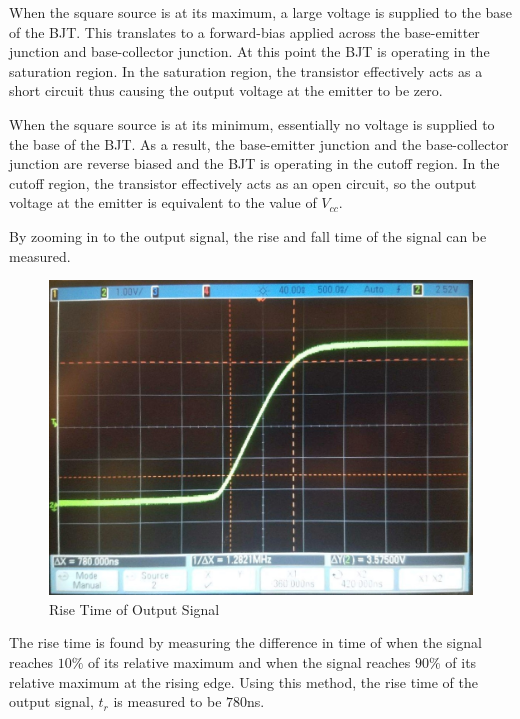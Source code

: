 When the square source is at its maximum, a large voltage is supplied to the base of the BJT. This translates to a forward-bias applied across the base-emitter junction and base-collector junction. At this point the BJT is operating in the saturation region. In the saturation region, the transistor effectively acts as a short circuit thus causing the output voltage at the emitter to be zero.

When the square source is at its minimum, essentially no voltage is supplied to the base of the BJT. As a result, the base-emitter junction and the base-collector junction are reverse biased and the BJT is operating in the cutoff region. In the cutoff region, the transistor effectively acts as an open circuit, so the output voltage at the emitter is equivalent to the value of $V_{cc}$.

By zooming in to the output signal, the rise and fall time of the signal can be measured.

\FloatBarrier
\begin{figure}[h!]
	\centering
	\includegraphics[scale=0.24]{../images/inverter_tr.jpeg}
	\caption{Rise Time of Output Signal}
	\label{fig:inverter_tr}
\end{figure}
\FloatBarrier

The rise time is found by measuring the difference in time of when the signal reaches $10\%$ of its relative maximum and when the signal reaches $90\%$ of its relative maximum at the rising edge. Using this method, the rise time of the output signal, $t_r$ is measured to be $780$\si{\nano\second}.

